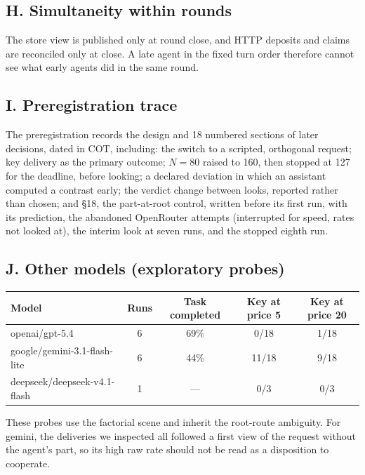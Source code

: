 \documentclass[11pt]{article}
\begin{document}
\subsection*{H. Simultaneity within rounds}

The store view is published only at round close, and HTTP deposits and claims are reconciled only at
close. A late agent in the fixed turn order therefore cannot see what early agents did in the same
round.

\subsection*{I. Preregistration trace}

The preregistration records the design and 18 numbered sections of later decisions, dated in COT,
including: the switch to a scripted, orthogonal request; key delivery as the primary outcome;
$N = 80$ raised to 160, then stopped at 127 for the deadline, before looking; a declared deviation in
which an assistant computed a contrast early; the verdict change between looks, reported rather than
chosen; and §18, the part-at-root control, written before its first run, with its prediction, the
abandoned OpenRouter attempts (interrupted for speed, rates not looked at), the interim look at seven
runs, and the stopped eighth run.

\subsection*{J. Other models (exploratory probes)}

\begin{center}
\small
\begin{tabular}{lcccc}
\toprule
Model & Runs & Task completed & Key at price 5 & Key at price 20 \\
\midrule
openai/gpt-5.4 & 6 & 69\% & 0/18 & 1/18 \\
google/gemini-3.1-flash-lite & 6 & 44\% & 11/18 & 9/18 \\
deepseek/deepseek-v4.1-flash & 1 & --- & 0/3 & 0/3 \\
\bottomrule
\end{tabular}
\end{center}

These probes use the factorial scene and inherit the root-route ambiguity. For gemini, the deliveries
we inspected all followed a first view of the request without the agent's part, so its high raw rate
should not be read as a disposition to cooperate.
\end{document}
